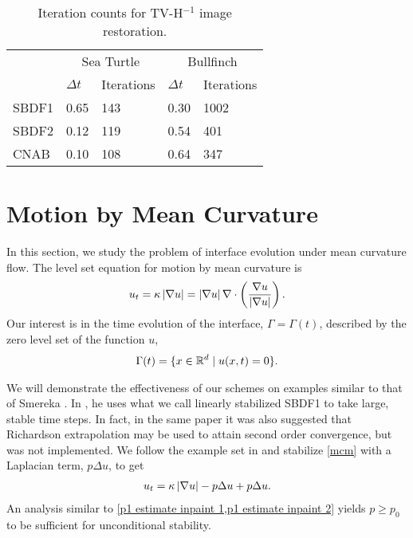 \begin{table}[htb!]
\caption[Iteration counts for TV-H$^{-1}$ image restoration.]{Iteration counts for TV-H$^{-1}$ image restoration.}
        \centering\begin{tabular}{lll ll} \toprule[1.25pt]
& \multicolumn{2}{c}{Sea Turtle} & \multicolumn{2}{c}{Bullfinch}
\\
& $\Delta t$ & Iterations & $\Delta t$ & Iterations
\\ \midrule
SBDF1 & 0.65 & 143 & 0.30 & 1002
\\
SBDF2& 0.12 & 119 & 0.54 & 401 
\\             
CNAB & 0.10 & 108 & 0.64 & 347
\\ \bottomrule[1.25pt]
\end{tabular}
\label{tab:bvhneg iter counts}
\end{table}


\section{Motion by Mean Curvature}
In this section, we study the problem of interface evolution under mean curvature flow. The level set equation for motion by mean curvature is 
\begin{align}
        u_t 
= \kappa\left|\nabla u\right| 
= \left|\nabla u\right| \nabla \cdot \left(\frac{\nabla u}{\left|\nabla u\right|} \right).
\label{mcm}
\end{align}
Our interest is in the time evolution of the interface, $\Gamma=\Gamma(t)$, described by the zero level set of the function $u$,
\begin{align}
        \Gamma(t) = \{x \in \mathbb{R}^d \mid u(x,t) =0\}.
\end{align}

We will demonstrate the effectiveness of our schemes on examples similar to that of Smereka \cite{smereka2003semi}. In \cite{smereka2003semi}, he uses what we call linearly stabilized SBDF1 to take large, stable time steps. In fact, in the same paper it was also suggested that Richardson extrapolation may be used to attain second order convergence, but was not implemented. We follow the example set in \cite{smereka2003semi} and stabilize \cref{mcm} with a Laplacian term, $p\Delta u$, to get 
\begin{align}
        u_t = \kappa \left|\nabla u\right| - p\Delta u + p\Delta u.
\end{align}
An analysis similar to \cref{p1 estimate inpaint 1,p1 estimate inpaint 2} yields $p\geq p_0$ to be sufficient for unconditional stability.

